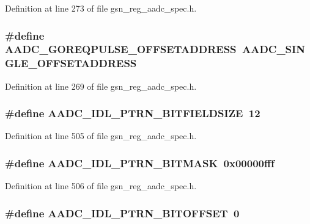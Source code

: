 Definition at line 273 of file gsn\_\-reg\_\-aadc\_\-spec.h.

\hypertarget{a00543_a8f4ee84591f75edabfd25de2b88ce71a}{
\subsubsection[{AADC\_\-GOREQPULSE\_\-OFFSETADDRESS}]{\setlength{\rightskip}{0pt plus 5cm}\#define AADC\_\-GOREQPULSE\_\-OFFSETADDRESS~AADC\_\-SINGLE\_\-OFFSETADDRESS}}
\label{a00543_a8f4ee84591f75edabfd25de2b88ce71a}


Definition at line 269 of file gsn\_\-reg\_\-aadc\_\-spec.h.

\hypertarget{a00543_a329fbed6d0cfd63d422a207f8ee3e971}{
\subsubsection[{AADC\_\-IDL\_\-PTRN\_\-BITFIELDSIZE}]{\setlength{\rightskip}{0pt plus 5cm}\#define AADC\_\-IDL\_\-PTRN\_\-BITFIELDSIZE~12}}
\label{a00543_a329fbed6d0cfd63d422a207f8ee3e971}


Definition at line 505 of file gsn\_\-reg\_\-aadc\_\-spec.h.

\hypertarget{a00543_a27f6cd2db00e589b8a26fd5f9ab1b520}{
\subsubsection[{AADC\_\-IDL\_\-PTRN\_\-BITMASK}]{\setlength{\rightskip}{0pt plus 5cm}\#define AADC\_\-IDL\_\-PTRN\_\-BITMASK~0x00000fff}}
\label{a00543_a27f6cd2db00e589b8a26fd5f9ab1b520}


Definition at line 506 of file gsn\_\-reg\_\-aadc\_\-spec.h.

\hypertarget{a00543_a790eb6f983b0eb3f76a5d67682f1ce5d}{
\subsubsection[{AADC\_\-IDL\_\-PTRN\_\-BITOFFSET}]{\setlength{\rightskip}{0pt plus 5cm}\#define AADC\_\-IDL\_\-PTRN\_\-BITOFFSET~0}}
\label{a00543_a790eb6f983b0eb3f76a5d67682f1ce5d}


